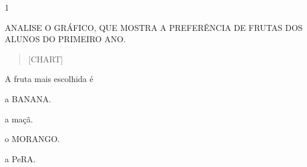 
\num{1}

ANALISE O GRÁFICO, QUE MOSTRA A PREFERÊNCIA DE FRUTAS DOS ALUNOS DO PRIMEIRO
ANO.

\begin{quote}
{{[}CHART{]}}
\end{quote}

A fruta mais escolhida é

\begin{escolha}
\item a BANANA.

\item a maçã.

\item o MORANGO.

\item a PeRA.
\end{escolha}

